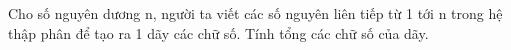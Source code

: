 Cho số nguyên dương n, người ta viết các số nguyên liên tiếp từ 1 tới n trong hệ thập phân để tạo ra 1 dãy các chữ số. Tính tổng các chữ số của dãy.  

\
